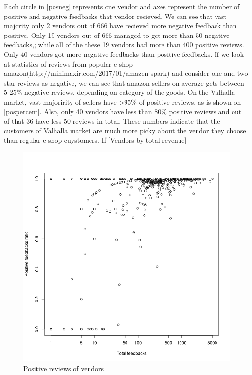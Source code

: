 \documentclass[
  digital, %
  table,   %
  lof,     %
  lot,     %
  oneside
]{fithesis3}
\begin{document}
Each circle in \ref{posneg} represents one vendor and axes represent
the number of positive and negative feedbacks that vendor recieved. 
We can see that vast majority only 2 vendors out of 666 have recieved more
negative feedback than positive.
Only 19 vendors out of 666 managed to get more than 50 negative feedbacks,;
while all of the these 19 vendors had more
 than 400 positive reviews.
Only 40 vendors got more negative feedbacks than positive feedbacks.
 If we look at statistics of reviews from popular e-shop amazon(http://minimaxir.com/2017/01/amazon-spark)
 and consider one and two star reviews as negative, we can see that amazon sellers on
 average gets between 5-25\% negative reviews, depending on category of the goods.
 On the Valhalla market, vast majoririty of sellers have >95\% of positive reviews, as is shown on \ref{pospercent}.
 Also, only 40 vendors have less than 80\% positive reviews and out of that 36 have less 50 reviews in total.
 These numbers indicate that the customers of Valhalla market
 are much more picky about the vendor they choose than regular e-shop cuystomers. 
 If \ref{Vendors by total revenue}
  

\begin{figure}[!htb]
    \centering
    \includegraphics[scale=0.4]{posratxtotal}
    \caption{Positive reviews of vendors}
    \label{posratxtotal}
\end{figure}
\end{document}

